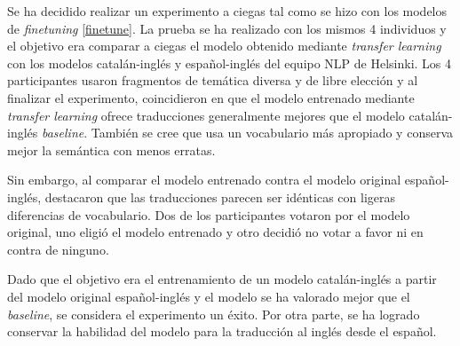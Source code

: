Se ha decidido realizar un experimento a ciegas tal como se hizo con los modelos de \textit{finetuning} \ref{finetune}. La prueba se ha realizado con los mismos 4 individuos y el objetivo era comparar a ciegas el modelo obtenido mediante \textit{transfer learning} con los modelos catalán-inglés y español-inglés del equipo NLP de Helsinki. Los 4 participantes usaron fragmentos de temática diversa y de libre elección y al finalizar el experimento, coincidieron en que el modelo entrenado mediante \textit{transfer learning} ofrece traducciones generalmente mejores que el modelo catalán-inglés \textit{baseline}. También se cree que usa un vocabulario más apropiado y conserva mejor la semántica con menos erratas.

Sin embargo, al comparar el modelo entrenado contra el modelo original español-inglés, destacaron que las traducciones parecen ser idénticas con ligeras diferencias de vocabulario. Dos de los participantes votaron por el modelo original, uno eligió el modelo entrenado y otro decidió no votar a favor ni en contra de ninguno.

Dado que el objetivo era el entrenamiento de un modelo catalán-inglés a partir del modelo original español-inglés y el modelo se ha valorado mejor que el \textit{baseline}, se considera el experimento un éxito. Por otra parte, se ha logrado conservar la habilidad del modelo para la traducción al inglés desde el español.

